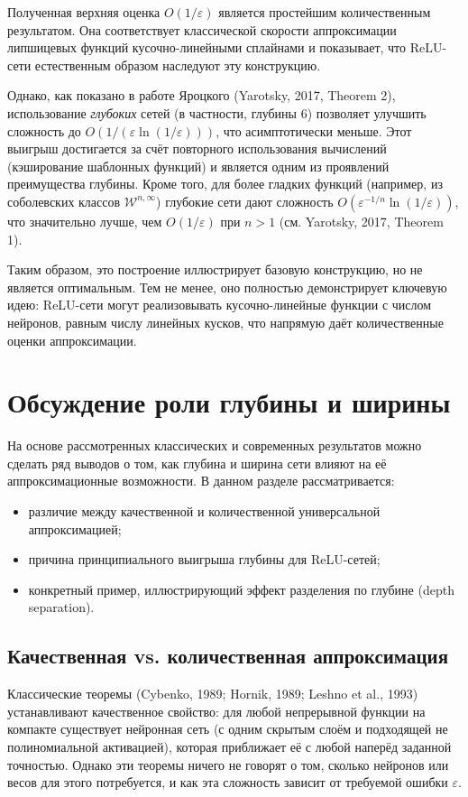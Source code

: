 \documentclass[12pt]{article}
\begin{document}
	Полученная верхняя оценка $O(1/\varepsilon)$ является простейшим количественным результатом. Она соответствует классической скорости аппроксимации липшицевых функций кусочно-линейными сплайнами и показывает, что ReLU-сети естественным образом наследуют эту конструкцию.
	
	Однако, как показано в работе Яроцкого (Yarotsky, 2017, Theorem 2), использование \textit{глубоких} сетей (в частности, глубины 6) позволяет улучшить сложность до $O(1/(\varepsilon\ln(1/\varepsilon)))$, что асимптотически меньше. Этот выигрыш достигается за счёт повторного использования вычислений (кэширование шаблонных функций) и является одним из проявлений преимущества глубины. Кроме того, для более гладких функций (например, из соболевских классов $\mathcal{W}^{n,\infty}$) глубокие сети дают сложность $O(\varepsilon^{-1/n}\ln(1/\varepsilon))$, что значительно лучше, чем $O(1/\varepsilon)$ при $n>1$ (см. Yarotsky, 2017, Theorem 1).
	
	Таким образом, это построение иллюстрирует базовую конструкцию, но не является оптимальным. Тем не менее, оно полностью демонстрирует ключевую идею: ReLU-сети могут реализовывать кусочно-линейные функции с числом нейронов, равным числу линейных кусков, что напрямую даёт количественные оценки аппроксимации.
	
	\section{Обсуждение роли глубины и ширины}
	
	На основе рассмотренных классических и современных результатов можно сделать ряд выводов о том, как глубина и ширина сети влияют на её аппроксимационные возможности. В данном разделе рассматривается:
	\begin{itemize}
		\item различие между качественной и количественной универсальной аппроксимацией;
		\item причина принципиального выигрыша глубины для ReLU-сетей;
		\item конкретный пример, иллюстрирующий эффект разделения по глубине (depth separation).
	\end{itemize}
	
	\subsection{Качественная vs. количественная аппроксимация}
	
	Классические теоремы (Cybenko, 1989; Hornik, 1989; Leshno et al., 1993) устанавливают качественное свойство: для любой непрерывной функции на компакте существует нейронная сеть (с одним скрытым слоём и подходящей не полиномиальной активацией), которая приближает её с любой наперёд заданной точностью. Однако эти теоремы ничего не говорят о том, сколько нейронов или весов для этого потребуется, и как эта сложность зависит от требуемой ошибки $\varepsilon$.
	
\end{document}
